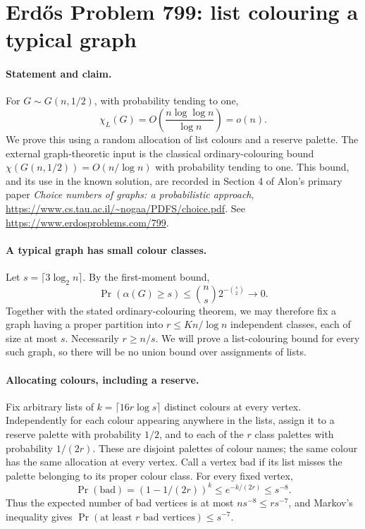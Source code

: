 \section*{Erd\H{o}s Problem 799: list colouring a typical graph}

\paragraph{Statement and claim.}
For \(G\sim G(n,1/2)\), with probability tending to one,
\[
 \chi_L(G)=O\left(\frac{n\log\log n}{\log n}\right)=o(n).
\]
We prove this using a random allocation of list colours
and a reserve palette. The external graph-theoretic input
is the classical ordinary-colouring bound
\(\chi(G(n,1/2))=O(n/\log n)\) with probability tending to one.
This bound, and its use in the known solution, are recorded
in Section 4 of Alon's primary paper
\emph{Choice numbers of graphs: a probabilistic approach},
\url{https://www.cs.tau.ac.il/~nogaa/PDFS/choice.pdf}.
See \url{https://www.erdosproblems.com/799}.

\paragraph{A typical graph has small colour classes.}
Let \(s=\lceil3\log_2 n\rceil\). By the first-moment bound,
\[
 \Pr(\alpha(G)\geq s)
 \leq\binom ns2^{-\binom s2}\longrightarrow0.
\]
Together with the stated ordinary-colouring theorem,
we may therefore fix a graph having a proper partition
into \(r\leq K n/\log n\) independent classes, each of size
at most \(s\). Necessarily \(r\geq n/s\).
We will prove a list-colouring bound for every such graph,
so there will be no union bound over assignments of lists.

\paragraph{Allocating colours, including a reserve.}
Fix arbitrary lists of
\(k=\lceil16r\log s\rceil\) distinct colours at every vertex.
Independently for each colour appearing anywhere in the
lists, assign it to a reserve palette with probability \(1/2\),
and to each of the \(r\) class palettes with probability \(1/(2r)\).
These are disjoint palettes of colour names; the same colour
has the same allocation at every vertex.
Call a vertex bad if its list misses the palette belonging
to its proper colour class.
For every fixed vertex,
\[
 \Pr(\text{bad})=(1-1/(2r))^k\leq e^{-k/(2r)}
 \leq s^{-8}.
\]
Thus the expected number of bad vertices is at most
\(ns^{-8}\leq rs^{-7}\), and Markov's inequality gives
\(\Pr(\text{at least }r\text{ bad vertices})\leq s^{-7}\).

